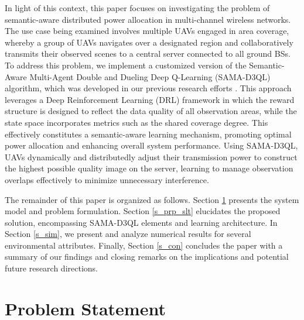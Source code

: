 \documentclass[conference]{IEEEtran}
\begin{document}
In light of this context, this paper focuses on investigating the problem of semantic-aware distributed power allocation in multi-channel wireless networks. The use case being examined involves multiple UAVs engaged in area coverage, whereby a group of UAVs navigates over a designated region and collaboratively transmits their observed scenes to a central server connected to all ground BSs. To address this problem, we implement a customized version of the Semantic-Aware Multi-Agent Double and Dueling Deep Q-Learning (SAMA-D3QL) algorithm, which was developed in our previous research efforts \cite{mazandarani2024semantic}. This approach leverages a Deep Reinforcement Learning (DRL) framework in which the reward structure is designed to reflect the data quality of all observation areas, while the state space incorporates metrics such as the shared coverage degree. This effectively constitutes a semantic-aware learning mechanism, promoting optimal power allocation and enhancing overall system performance. Using SAMA-D3QL, UAVs dynamically and distributedly adjust their transmission power to construct the highest possible quality image on the server, learning to manage observation overlaps effectively to minimize unnecessary interference.

The remainder of this paper is organized as follows. Section \ref{s_prb_stt} presents the system model and problem formulation. Section \ref{s_prp_slt} elucidates the proposed solution, encompassing SAMA-D3QL elements and learning architecture. In Section \ref{s_sim}, we present and analyze numerical results for several environmental attributes. Finally, Section \ref{s_con} concludes the paper with a summary of our findings and closing remarks on the implications and potential future research directions.

\vspace{-4pt}
\section{Problem Statement}\label{s_prb_stt}
\end{document}
